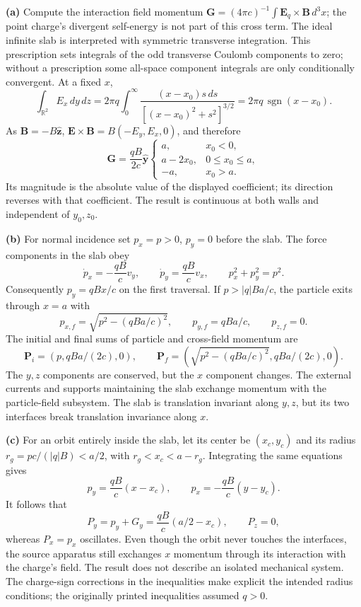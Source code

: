 \medskip\noindent\textbf{(a)} Compute the interaction field momentum
$\mathbf G=(4\pi c)^{-1}\int\mathbf E_q\times\mathbf B\,d^3x$;
the point charge's divergent self-energy is not part of this cross
term.  The ideal infinite slab is interpreted with symmetric
transverse integration.  This prescription sets integrals of the
odd transverse Coulomb components to zero; without a prescription
some all-space component integrals are only conditionally convergent.
At a fixed $x$,
\[
\int_{\mathbb R^2}E_x\,dy\,dz
=2\pi q\int_0^\infty
 \frac{(x-x_0)s\,ds}{[(x-x_0)^2+s^2]^{3/2}}
=2\pi q\,\operatorname{sgn}(x-x_0).
\]
As $\mathbf B=-B\widehat{\mathbf z}$,
$\mathbf E\times\mathbf B=B(-E_y,E_x,0)$, and therefore
\[
\boxed{\mathbf G=\frac{qB}{2c}\widehat{\mathbf y}
\begin{cases}
a,&x_0<0,\\
a-2x_0,&0\leq x_0\leq a,\\
-a,&x_0>a.
\end{cases}}
\]
Its magnitude is the absolute value of the displayed coefficient;
its direction reverses with that coefficient.  The result is
continuous at both walls and independent of $y_0,z_0$.

\medskip\noindent\textbf{(b)} For normal incidence set $p_x=p>0$, $p_y=0$ before the slab.
The force components in the slab obey
\[
\dot p_x=-\frac{qB}{c}v_y,\qquad
\dot p_y=\frac{qB}{c}v_x,
\qquad p_x^2+p_y^2=p^2.
\]
Consequently $p_y=qBx/c$ on the first traversal.  If
$p>|q|Ba/c$, the particle exits through $x=a$ with
\[
\boxed{p_{x,f}=\sqrt{p^2-(qBa/c)^2},\qquad
p_{y,f}=qBa/c,\qquad p_{z,f}=0.}
\]
The initial and final sums of particle and cross-field momentum are
\[
\mathbf P_i=(p,qBa/(2c),0),\qquad
\mathbf P_f=(\sqrt{p^2-(qBa/c)^2},qBa/(2c),0).
\]
The $y,z$ components are conserved, but the $x$ component changes.
The external currents and supports maintaining the slab exchange
momentum with the particle-field subsystem.  The slab is
translation invariant along $y,z$, but its two interfaces break
translation invariance along $x$.

\medskip\noindent\textbf{(c)} For an orbit entirely inside the slab, let its center be $(x_c,y_c)$
and its radius $r_g=pc/(|q|B)<a/2$, with
$r_g<x_c<a-r_g$.  Integrating the same equations gives
\[
p_y=\frac{qB}{c}(x-x_c),\qquad
p_x=-\frac{qB}{c}(y-y_c).
\]
It follows that
\[
\boxed{P_y=p_y+G_y=\frac{qB}{c}(a/2-x_c),\qquad P_z=0,}
\]
whereas $P_x=p_x$ oscillates.  Even though the orbit never touches
the interfaces, the source apparatus still exchanges $x$ momentum
through its interaction with the charge's field.  The result does
not describe an isolated mechanical system.  The charge-sign
corrections in the inequalities make explicit the intended radius
conditions; the originally printed inequalities assumed $q>0$.

